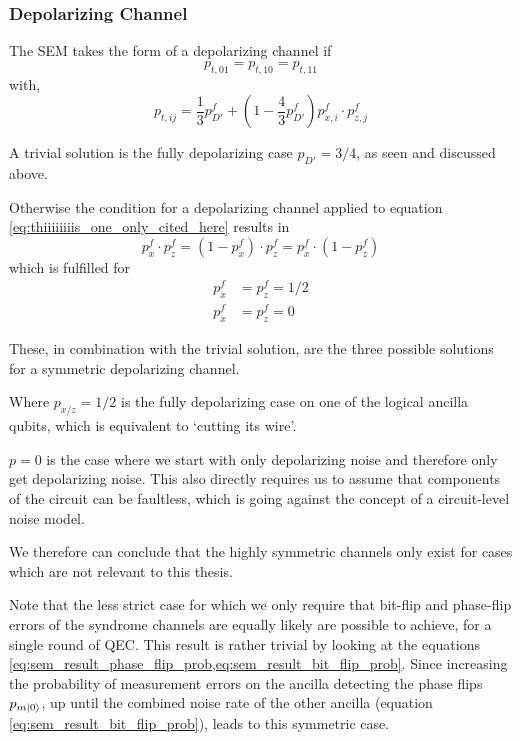 \subsubsection{Depolarizing Channel}

The SEM takes the form of a depolarizing channel if 
\begin{equation}
    p_{t,01}=p_{t,10}=p_{t,11}
\end{equation}
with,
\begin{equation}
    p_{t,ij} = \frac{1}{3} p_{D'}^f + \left( 1- \frac{4}{3} p_{D'}^f \right) p_{x,i}^f \cdot p_{z,j}^f 
    \label{eq:thiiiiiiiis_one_only_cited_here}
\end{equation}

A trivial solution is the fully depolarizing case $p_{D'}=3/4$, as seen and discussed above.

Otherwise the condition for a depolarizing channel applied to equation \eqref{eq:thiiiiiiiis_one_only_cited_here} results in 
\begin{equation}
    p_{x}^f\cdot p_{z}^f = 
    (1-p_{x}^f)\cdot p_{z}^f = 
    p_{x}^f\cdot (1-p_{z}^f)  
\end{equation}
which is fulfilled for  
\begin{align*}
    p_x^f &= p_z^f = 1/2\\
    p_x^f &= p_z^f = 0 
\end{align*}

These, in combination with the trivial solution, are the three possible solutions for a symmetric depolarizing channel.

Where $p_{x/z}=1/2$ is the fully depolarizing case on one of the logical ancilla qubits, which is equivalent to `cutting its wire'.

$p=0$ is the case where we start with only depolarizing noise and therefore only get depolarizing noise.
This also directly requires us to assume that components of the circuit can be faultless, which is going against the concept of a circuit-level noise model.

We therefore can conclude that the highly symmetric channels only exist for cases which are not relevant to this thesis. 

Note that the less strict case for which we only require that bit-flip and phase-flip errors of the syndrome channels are equally likely are possible to achieve, 
for a single round of QEC.
This result is rather trivial by looking at the equations \cref{eq:sem_result_phase_flip_prob,eq:sem_result_bit_flip_prob}.
Since increasing the probability of measurement errors on the ancilla detecting the phase flips $p_{m\ket{0}}$, 
up until the combined noise rate of the other ancilla (equation \eqref{eq:sem_result_bit_flip_prob}), leads to this symmetric case.

